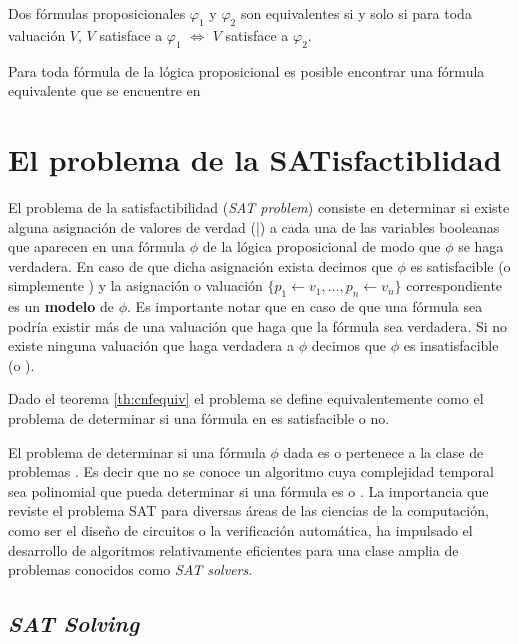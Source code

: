 \begin{definition}
 Dos fórmulas proposicionales $\varphi_1$ y $\varphi_2$ son equivalentes si y solo si para toda valuación $V$, $V$ satisface a $\varphi_1$ $\Longleftrightarrow$ $V$ satisface a $\varphi_2$.
\end{definition}

\begin{theorem}\label{th:cnfequiv}
Para toda fórmula de la lógica proposicional es posible encontrar una fórmula equivalente que se encuentre en \cnf
\end{theorem}

\section{El problema de la SATisfactiblidad}

El problema de la satisfactibilidad (\emph{SAT problem}) consiste en determinar
si existe alguna asignación de valores de verdad (\true|\false) a cada una de
las variables booleanas que aparecen en una fórmula $\phi$ de la lógica
proposicional de modo que $\phi$ se haga verdadera. En caso de que dicha
asignación exista decimos que $\phi$ es satisfacible (o simplemente \sat) y la
asignación o valuación $\{ p_1 \leftarrow v_1, \ldots, p_n \leftarrow v_n \}$
correspondiente es un \textbf{modelo} de $\phi$. Es importante notar que en caso
de que una fórmula sea \sat podría existir más de una valuación que haga que la
fórmula sea verdadera. Si no existe ninguna valuación que haga verdadera a
$\phi$ decimos que $\phi$ es insatisfacible (o \unsat).

Dado el teorema \ref{th:cnfequiv} el problema \sat se define equivalentemente
como el problema de determinar si una fórmula en \cnf es satisfacible o no.

El problema de determinar si una fórmula $\phi$ dada es \sat o \unsat pertenece
a la clase de problemas \npc\cite{Cook:1971:CTP:800157.805047}. Es decir que no
se conoce un algoritmo cuya complejidad temporal sea polinomial que pueda determinar si una fórmula es \sat
o \unsat. La importancia que reviste el problema SAT para diversas áreas de las
ciencias de la computación, como ser el diseño de circuitos o la verificación
automática, ha impulsado el desarrollo de algoritmos relativamente eficientes
para una clase amplia de problemas conocidos como \emph{SAT solvers}.

\subsection{\emph{SAT Solving}}

